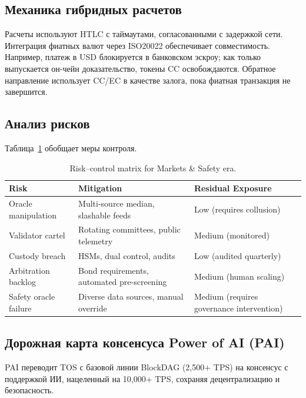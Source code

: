 \documentclass[11pt]{article}
\begin{document}
\subsection{Механика гибридных расчетов}
Расчеты используют HTLC с таймаутами, согласованными с задержкой сети. Интеграция фиатных валют через ISO20022 обеспечивает совместимость. Например, платеж в USD блокируется в банковском эскроу; как только выпускается он-чейн доказательство, токены CC освобождаются. Обратное направление использует CC/EC в качестве залога, пока фиатная транзакция не завершится.

\subsection{Анализ рисков}
Таблица~\ref{tab:risk-markets} обобщает меры контроля.

\begin{table}[H]
  \centering
  \begin{tabular}{p{}p{}p{}}
    \toprule
    \textbf{Risk} & \textbf{Mitigation} & \textbf{Residual Exposure} \\
    \midrule
    Oracle manipulation & Multi-source median, slashable feeds & Low (requires collusion) \\
    Validator cartel & Rotating committees, public telemetry & Medium (monitored) \\
    Custody breach & HSMs, dual control, audits & Low (audited quarterly) \\
    Arbitration backlog & Bond requirements, automated pre-screening & Medium (human scaling) \\
    Safety oracle failure & Diverse data sources, manual override & Medium (requires governance intervention) \\
    \bottomrule
  \end{tabular}
  \caption{Risk--control matrix for Markets \& Safety era.}
  \label{tab:risk-markets}
\end{table}

\subsection{Дорожная карта консенсуса Power of AI (PAI)}
\label{sec:pai-roadmap}
PAI переводит TOS с базовой линии BlockDAG (2,500+ TPS) на консенсус с поддержкой ИИ, нацеленный на 10,000+ TPS, сохраняя децентрализацию и безопасность.
\end{document}
